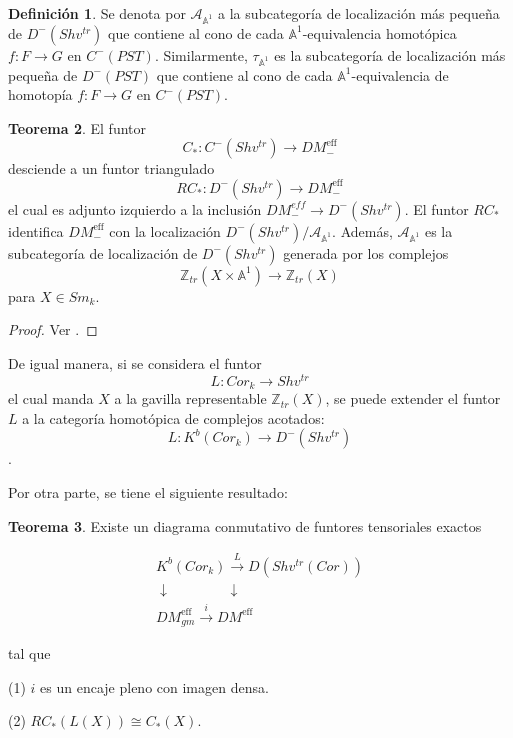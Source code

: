 \documentclass[10pt]{amsart}
\theoremstyle{definition}
\newtheorem{definition}{Definici\'on}[section]
\newtheorem{theorem}[definition]{Teorema}
\theoremstyle{remark}
\theoremstyle{definition}
\begin{document}
\begin{definition}
Se denota por $\mathcal{A}_{\mathbb{A}^1}$ a la subcategoría de localización más pequeña de $D^{-}(Shv^{tr})$ que contiene al cono de cada $\mathbb{A}^1$-equivalencia homotópica $f:F \rightarrow G$ en $C^{-}(PST)$. Similarmente, $\tau_{\mathbb{A}^1}$ es la subcategoría de localización más pequeña de $D^{-}(PST)$ que contiene al cono de cada $\mathbb{A}^1$-equivalencia de homotopía $f:F \rightarrow G$ en $C^{-}(PST)$.
\end{definition}

\begin{theorem}
El funtor
\begin{equation*}
C_{*}:C^{-}(Shv^{tr}) \rightarrow DM^{\textrm{eff}}_{-}
\end{equation*}
desciende a un funtor triangulado
\begin{equation*}
RC_{*}:D^{-}(Shv^{tr}) \rightarrow DM^{\textrm{eff}}_{-}
\end{equation*}
el cual es adjunto izquierdo a la inclusión $DM^{eff}_{-} \rightarrow D^{-}(Shv^{tr})$. El funtor $RC_{*}$ identifica $DM^{\textrm{eff}}_{-}$ con la localización $D^{-}(Shv^{tr})/\mathcal{A}_{\mathbb{A}^1}$. Además, $\mathcal{A}_{\mathbb{A}^1}$ es la subcategoría de localización de $D^{-}(Shv^{tr})$ generada por los complejos
\begin{equation*}
\mathbb{Z}_{tr}(X \times \mathbb{A}^1) \rightarrow \mathbb{Z}_{tr}(X)
\end{equation*}
 para $X \in Sm_{\mathit{k}}$.
\end{theorem}

\begin{proof}
Ver \cite[ Prop. 3.2.3]{Vo1}.
\end{proof}

De igual manera, si se considera el funtor
\begin{equation*}
L:Cor_{k} \rightarrow Shv^{tr}
\end{equation*}
el cual manda $X$ a la gavilla representable $\mathbb{Z}_{tr}(X)$, se puede extender el funtor $L$ a la categoría homotópica de complejos acotados:
\begin{equation*}
L:K^{b}(Cor_{k}) \rightarrow D^{-}(Shv^{tr})
\end{equation*}.

Por otra parte, se tiene el siguiente resultado:
\begin{theorem} Existe un diagrama conmutativo de funtores tensoriales exactos

\[ \begin{array}{c} K^b(Cor_{k}) \xrightarrow{L} D(Shv^{tr}(Cor)) \\ \downarrow \qquad \qquad \downarrow \\ DM_{gm}^{\text{eff}} \xrightarrow{i} DM^{\text{eff}} \end{array} \]

tal que

(1) $i$ es un encaje pleno con imagen densa.

(2) $RC_*(L(X)) \cong C_*(X)$.
\end{theorem}
\end{document}
